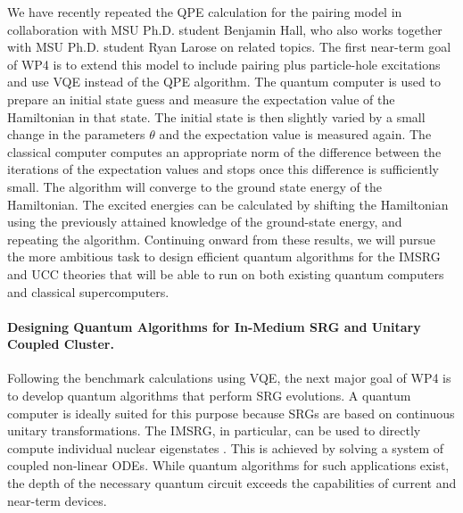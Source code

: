 \documentclass[11pt]{article}
\begin{document}
We have recently repeated the QPE calculation for the pairing model in collaboration with MSU Ph.D. student Benjamin Hall, who also works together with MSU Ph.D. student Ryan Larose on related topics. The first near-term goal of WP4 is to extend this model to include pairing plus particle-hole excitations \cite{Hjorth-Jensen:2010qf} and use VQE instead of the QPE algorithm. 
The quantum computer is used to prepare an initial state guess and measure the expectation value of the Hamiltonian in that state. The initial state is then slightly varied by a small change in the parameters $\theta$ and the expectation value is measured again. The classical computer computes an appropriate norm of the difference between the iterations of the expectation values and stops once this difference is sufficiently small. The algorithm will converge to the ground state energy of the Hamiltonian. The excited energies can be calculated by shifting the Hamiltonian using the previously attained knowledge of the ground-state energy, and repeating the algorithm. Continuing onward from these results, we will pursue the more ambitious task to design efficient quantum  algorithms for the IMSRG and UCC theories that will be able to run on both existing quantum computers and classical supercomputers. 

\paragraph{Designing Quantum Algorithms for In-Medium SRG and Unitary Coupled Cluster.} 
Following the benchmark calculations using VQE, the next major goal of WP4 is to develop quantum algorithms that perform SRG evolutions. A quantum computer is ideally suited for this purpose because SRGs are based on continuous unitary transformations. The IMSRG, in particular, can be used to directly compute individual nuclear eigenstates \cite{Hergert:2016jk,Hergert:2016ij,Hergert:2017kx}. This is achieved by solving a system of coupled non-linear ODEs. While quantum algorithms for such applications exist, the depth of the necessary quantum circuit exceeds the capabilities of current and near-term devices.
\end{document}
